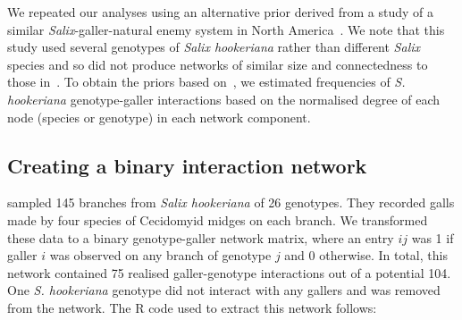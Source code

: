 \documentclass[12pt]{article}
\begin{document}
  We repeated our analyses using an alternative prior derived from a study of a similar \emph{Salix}-galler-natural enemy system in North America~\citep{Barbour2016,Barbour2016Dryad}. We note that this study used several genotypes of \emph{Salix hookeriana} rather than different \emph{Salix} species and so did not produce networks of similar size and connectedness to those in~\citep{Kopelke2017}.  To obtain the priors based on~\citet{Barbour2016}, we estimated frequencies of  \emph{S. hookeriana} genotype-galler interactions based on the normalised degree of each node (species or genotype) in each network component.

    \subsection*{Creating a binary interaction network}

      \citet{Barbour2016,Barbour2016Dryad} sampled 145 branches from 
      \emph{Salix hookeriana} of 26 genotypes. They recorded galls 
      made by four species of Cecidomyid midges on each branch. We 
      transformed these data to a binary genotype-galler network 
      matrix, where an entry $ij$ was 1 if galler $i$ was observed 
      on any branch of genotype $j$ and 0 otherwise. In total, this 
      network contained 75 realised galler-genotype interactions 
      out of a potential 104. One \emph{S. hookeriana} genotype did
      not interact with any gallers and was removed from the network.
      The R code used to extract this 
      network follows:
\end{document}

